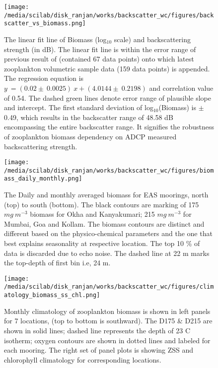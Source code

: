 \documentclass{article}
\begin{document}
\newpage
\begin{figure}[htbp]
	\centering
	\texttt{[image: /media/scilab/disk\_ranjan/works/backscatter\_wc/figures/backscatter\_vs\_biomass.png]} 
	\captionsetup{justification=justified,font=footnotesize,skip=0.05\baselineskip,width=0.8\textwidth}
	\caption{The linear fit line of Biomass (log$_{10}$ scale) and backscattering strength (in dB). The linear fit line is within the error range of previous result of \citep{aparna2022seasonal} (contained 67 data points) onto which latest zooplankton volumetric sample data (159 data points) is appended. The regression equation is $y\ = (0.02 \pm\ 0.0025) \ x + (4.0144 \pm \ 0.2198) $ and correlation value of 0.54. The dashed green lines denote error range of plausible slope and intercept. The first standard deviation of log$_{10}$(Biomass) is $\pm$ 0.49, which results in the backscatter range of 48.58 dB encompassing the entire backscatter range. It signifies the robustness of zooplankton biomass dependency on ADCP measured backscattering strength.}
	\label{fig:bstobm}
\end{figure}


\newpage

\begin{figure}[htbp]
	\centering
	\texttt{[image: /media/scilab/disk\_ranjan/works/backscatter\_wc/figures/biomass\_daily\_monthly.png]} 
	\captionsetup{justification=justified,font=footnotesize,skip=0.05\baselineskip,width=\textwidth}
	\caption{The Daily and monthly averaged biomass for EAS moorings, north (top) to south (bottom). The black contours are marking of 175 $mg\ m^{-3}$ biomass for Okha and Kanyakumari; 215 $mg\ m^{-3}$  for Mumbai, Goa and Kollam. The biomass contours are distinct and different based on the physico-chemical parameters and the one that best explains seasonality at respective location.  The top 10 \% of data is discarded due to echo noise. The dashed line at 22 m marks the top-depth of first bin i.e, 24 m.}
	\label{fig:dailynmonthly}
\end{figure}

\begin{figure}[htbp]
	\centering
	\texttt{[image: /media/scilab/disk\_ranjan/works/backscatter\_wc/figures/climatology\_biomass\_ss\_chl.png]} 
	\captionsetup{justification=justified,font=footnotesize,skip=0.05\baselineskip,width=\textwidth}
	\caption{Monthly climatology of zooplankton biomass is shown in left panels for 7 locations, (top to bottom is southward). The D175 \& D215 are shown in solid lines; dashed line represents the depth of 23 C isotherm; oxygen contours are shown in dotted lines and labeled for each mooring. The right set of panel plots is showing ZSS and chlorophyll climatology for corresponding locations.}
	\label{fig:zsschlclim}
\end{figure}
\end{document}
